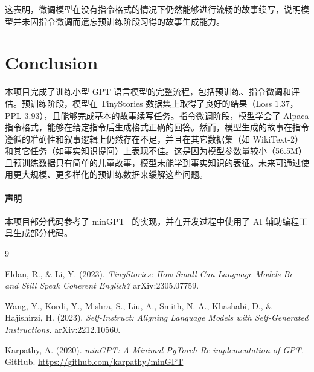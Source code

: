 \documentclass{article}
\begin{document}
这表明，微调模型在没有指令格式的情况下仍然能够进行流畅的故事续写，说明模型并未因指令微调而遗忘预训练阶段习得的故事生成能力。

\section{Conclusion}

本项目完成了训练小型 GPT 语言模型的完整流程，包括预训练、指令微调和评估。预训练阶段，模型在 TinyStories 数据集上取得了良好的结果（Loss $1.37$，PPL $3.93$），且能够完成基本的故事续写任务。指令微调阶段，模型学会了 Alpaca 指令格式，能够在给定指令后生成格式正确的回答。然而，模型生成的故事在指令遵循的准确性和叙事逻辑上仍然存在不足，并且在其它数据集（如 WikiText-2）和其它任务（如事实知识提问）上表现不佳。这是因为模型参数量较小（56.5M）且预训练数据只有简单的儿童故事，模型未能学到事实知识的表征。未来可通过使用更大规模、更多样化的预训练数据来缓解这些问题。

\paragraph*{声明}
本项目部分代码参考了 minGPT~\cite{karpathy2020mingpt} 的实现，并在开发过程中使用了 AI 辅助编程工具生成部分代码。


\begin{thebibliography}{9}

Eldan, R., \& Li, Y. (2023). \emph{TinyStories: How Small Can Language Models Be and Still Speak Coherent English?} arXiv:2305.07759.

Wang, Y., Kordi, Y., Mishra, S., Liu, A., Smith, N. A., Khashabi, D., \& Hajishirzi, H. (2023). \emph{Self-Instruct: Aligning Language Models with Self-Generated Instructions.} arXiv:2212.10560.

Karpathy, A. (2020). \emph{minGPT: A Minimal PyTorch Re-implementation of GPT.} GitHub. \url{https://github.com/karpathy/minGPT}

\end{thebibliography}
\end{document}
